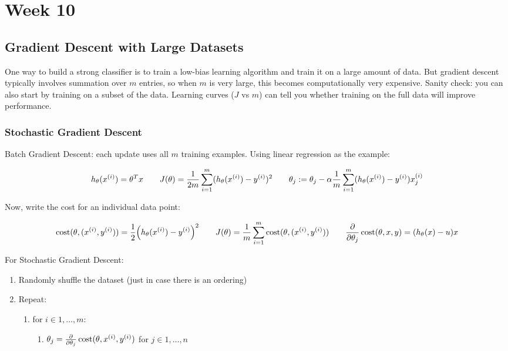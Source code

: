 \chapter{Week 10}

\section{Gradient Descent with Large Datasets}

One way to build a strong classifier is to train a low-bias learning algorithm and train 
it on a large amount of data.
But gradient descent typically involves summation over $m$ entries, so when $m$ is very
large, this becomes computationally very expensive.
Sanity check: you can also start by training on a subset of the data.
Learning curves ($J$ vs $m$) can tell you whether training on the full data will improve performance.

\subsection{Stochastic Gradient Descent}

Batch Gradient Descent: each update uses all $m$ training examples.
Using linear regression as the example:

\[
    h_\theta(x_{}^{(i)}) = \theta^T x
    \qquad
    J(\theta) = \frac{1}{2m} \sum_{i=1}^m (h_\theta(x_{}^{(i)}) - y_{}^{(i)})^2
    \qquad
    \theta_j := \theta_j - \alpha \frac{1}{m} \sum_{i=1}^m (h_\theta(x_{}^{(i)}) - y_{}^{(i)})x_{j}^{(i)}
\]

Now, write the cost for an individual data point:

\[
    \operatorname{cost}(\theta, (x_{}^{(i)}, y_{}^{(i)})) = \frac{1}{2}\qty( h_\theta(x_{}^{(i)}) - y_{}^{(i)} )^2
    \qquad
    J(\theta) = \frac{1}{m} \sum_{i=1}^m \operatorname{cost}(\theta, (x_{}^{(i)}, y_{}^{(i)}))
    \qquad
    \pdv{\theta_j} \operatorname{cost}(\theta, x, y) = (h_\theta(x) - u) x
\]

For Stochastic Gradient Descent:

\begin{enumerate}
    \item Randomly shuffle the dataset (just in case there is an ordering)
    \item Repeat:
    \begin{enumerate}
        \item for $i \in {1, \dots, m}$:
        \begin{enumerate}
            \item $\theta_j = \pdv{\theta_j}\operatorname{cost}(\theta, x_{}^{(i)}, y_{}^{(i)})$
                  for $j \in {1, \dots, n}$
        \end{enumerate}
    \end{enumerate}
\end{enumerate}

